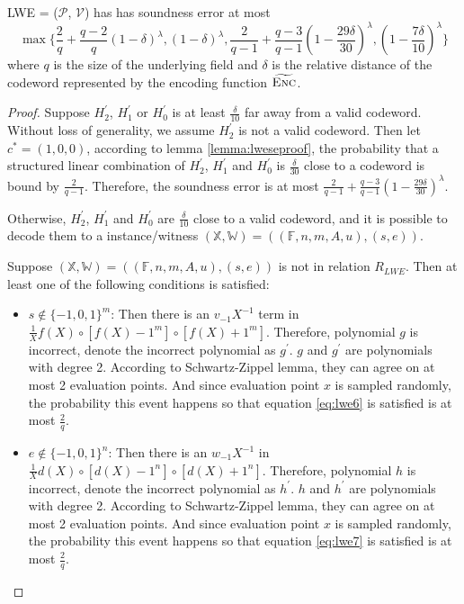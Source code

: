 \begin{lemma}
\label{lemma:lwese}

LWE = ($\mathcal{P}$, $\mathcal{V}$) has has soundness error at most 
$$
    \max
    \biggl\{
    \frac{2}{q} + \frac{q-2}{q}(1 - \delta)^\lambda, 
    (1 - \delta)^\lambda, 
    \frac{2}{q-1} + \frac{q-3}{q-1}(1 - \frac{29\delta}{30})^\lambda,
    (1 - \frac{7\delta}{10})^\lambda
    \biggr\}
$$
where $q$ is the size of the underlying field and $\delta$ is the relative distance of the codeword represented by the encoding function $\widetilde{\textsc{Enc}}$.

\end{lemma}
\begin{proof}

Suppose $H_2^\prime$, $H_1^\prime$ or $H_0^\prime$ is at least $\frac{\delta}{10}$ far away from a valid codeword. Without loss of generality, we assume $H_2^\prime$ is not a valid codeword. Then let $c^* = (1, 0, 0)$, according to lemma \ref{lemma:lweseproof}, the probability that a structured linear combination of $H_2^\prime$, $H_1^\prime$ and $H_0^\prime$ is $\frac{\delta}{30}$ close to a codeword is bound by $\frac{2}{q-1}$. Therefore, the soundness error is at most $\frac{2}{q-1} + \frac{q-3}{q-1}(1 - \frac{29\delta}{30})^\lambda$.

Otherwise, $H_2^\prime$, $H_1^\prime$ and $H_0^\prime$ are $\frac{\delta}{10}$ close to a valid codeword, and it is possible to decode them to a instance/witness $(\mathbb{X}, \mathbb{W}) = ((\mathbb{F}, n, m, A, u), (s, e))$. 

Suppose $(\mathbb{X}, \mathbb{W}) = ((\mathbb{F}, n, m, A, u), (s, e))$ is not in relation $R_{LWE}$. Then at least one of the following conditions is satisfied:
\begin{itemize}
    \item $s \notin \{-1, 0, 1\}^{m}$: Then there is an $v_{-1} X^{-1}$ term in $\frac{1}{X} f(X) \circ [f(X) - 1^m] \circ [f(X) + 1^m]$. Therefore, polynomial $g$ is incorrect, denote the incorrect polynomial as $g^\prime$. $g$ and $g^\prime$ are polynomials with degree 2. According to Schwartz-Zippel lemma, they can agree on at most 2 evaluation points. And since evaluation point $x$ is sampled randomly, the probability this event happens so that equation \ref{eq:lwe6} is satisfied is at most $\frac{2}{q}$. 
    
    \item $e \notin \{-1, 0, 1\}^{n}$: Then there is an $w_{-1} X^{-1}$ in $\frac{1}{X} d(X) \circ [d(X) - 1^n] \circ [d(X) + 1^n]$. Therefore, polynomial $h$ is incorrect, denote the incorrect polynomial as $h^\prime$. $h$ and $h^\prime$ are polynomials with degree 2. According to Schwartz-Zippel lemma, they can agree on at most 2 evaluation points. And since evaluation point $x$ is sampled randomly, the probability this event happens so that equation \ref{eq:lwe7} is satisfied is at most $\frac{2}{q}$. 
    

\end{itemize}
\end{proof}
